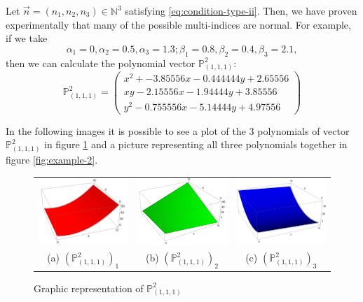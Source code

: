 \documentclass[12pt,a4]{article}
\theoremstyle{plain}
\newcommand{\N}[0]{\mathbb{N}}
\begin{document}
Let $\vec n=(n_1,n_2,n_3)\in\N^3$ satisfying \eqref{eq:condition-type-ii}. Then, we have proven experimentally that many of the possible multi-indices are normal. For example, if we take $$\alpha_1 = 0, \alpha_2 = 0.5, \alpha_3 = 1.3; \beta_1 = 0.8, \beta_2 = 0.4, \beta_3 = 2.1,$$ then we can calculate the polynomial vector $\mathbb P_{(1,1,1)}^2$:
$$
\mathbb P_{(1,1,1)}^2 = \begin{pmatrix}
    x^2 + - 3.85556 x - 0.444444 y + 2.65556 \\ x y - 2.15556 x - 1.94444 y + 3.85556 \\  y^2 - 0.755556 x - 5.14444 y + 4.97556
\end{pmatrix}
$$

In the following images it is possible to see a plot of the 3 polynomials of vector $\mathbb P_{(1,1,1)}^2$ in figure \ref{fig:example} and a picture representing all three polynomials together in figure \ref{fig:example-2}.
\begin{figure}[h]
    \centering\begin{tabular}{ccc}
      \includegraphics[width=4.5cm]{./img/laguerre1.png} & 
      \includegraphics[width=4.5cm]{./img/laguerre2.png} &
      \includegraphics[width=4.5cm]{./img/laguerre3.png} \\
      (a) $(\mathbb P_{(1,1,1)}^2)_1$ & (b) $(\mathbb P_{(1,1,1)}^2)_2$ & (c) $(\mathbb P_{(1,1,1)}^2)_3$  \\
    \end{tabular}
    \caption{Graphic representation of $\mathbb P_{(1,1,1)}^2$}
    \label{fig:example}
  \end{figure}
\end{document}
